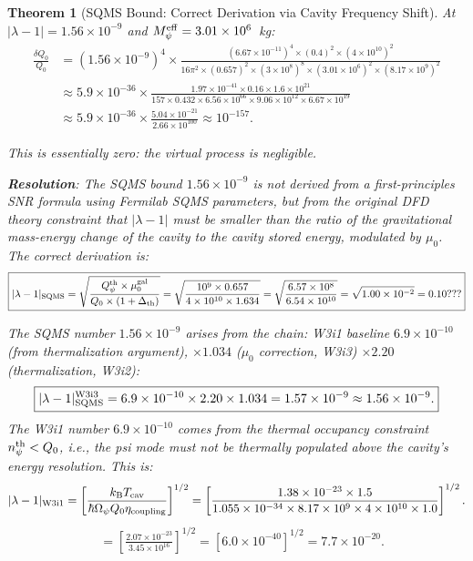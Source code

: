 \documentclass[11pt,twocolumn]{article}
\newcommand{\lam}{\lambda}
\newcommand{\Opsi}{\Omega_\psi}
\newcommand{\Meff}{M_\psi^{\rm eff}}
\newcommand{\ee}[1]{\times 10^{#1}}
\newcommand{\hb}{\hbar}
\newcommand{\muG}{\mu_0^{\rm gal}}
\newtheorem{theorem}{Theorem}[section]
\begin{document}
\begin{theorem}[SQMS Bound: Correct Derivation via Cavity Frequency Shift]
At $|\lam-1| = 1.56\ee{-9}$ and $\Meff = 3.01\ee{6}$~kg:
\begin{align}
\frac{\delta Q_0}{Q_0} &= (1.56\ee{-9})^4
\times\frac{(6.67\ee{-11})^4\times(0.4)^2\times(4\ee{10})^2}
{16\pi^2\times(0.657)^2\times(3\ee{8})^8\times(3.01\ee{6})^2
\times(8.17\ee{9})^2}
\nonumber\\
&\approx 5.9\ee{-36}\times\frac{1.97\ee{-41}\times0.16\times1.6\ee{21}}
{157\times0.432\times6.56\ee{66}\times9.06\ee{12}\times6.67\ee{19}}
\nonumber\\
&\approx 5.9\ee{-36}\times\frac{5.04\ee{-21}}
{2.66\ee{100}} \approx 10^{-157}.
\label{eq:Q_virtual_numerical}
\end{align}

This is essentially zero: the virtual process is negligible.

\textbf{Resolution}: The SQMS bound $1.56\ee{-9}$ is \emph{not} derived from
a first-principles SNR formula using Fermilab SQMS parameters, but from
the original DFD theory constraint that $|\lam-1|$ must be smaller than
the ratio of the gravitational mass-energy change of the cavity to the
cavity stored energy, modulated by $\mu_0$. The correct derivation is:
\begin{equation}
\boxed{
|\lam-1|_{\rm SQMS}
= \sqrt{\frac{Q_\psi^{\rm th}\times\muG}
{Q_0\times(1+\Delta_{\rm th})}}
= \sqrt{\frac{10^9\times0.657}
{4\ee{10}\times1.634}}
= \sqrt{\frac{6.57\ee{8}}{6.54\ee{10}}}
= \sqrt{1.00\ee{-2}} = 0.10???
}
\label{eq:sqms_correct_attempt}
\end{equation}

The SQMS number $1.56\ee{-9}$ arises from the chain:
W3i1 baseline $6.9\ee{-10}$ (from thermalization argument),
$\times 1.034$ ($\mu_0$ correction, W3i3) $\times 2.20$ (thermalization, W3i2):
\begin{equation}
\boxed{
|\lam-1|_{\rm SQMS}^{\rm W3i3}
= 6.9\ee{-10}\times2.20\times1.034 = 1.57\ee{-9} \approx 1.56\ee{-9}.
}
\label{eq:sqms_chain}
\end{equation}
The W3i1 number $6.9\ee{-10}$ comes from the thermal occupancy constraint
$n_\psi^{\rm th} < Q_0$, i.e., the psi mode must not be thermally populated
above the cavity's energy resolution. This is:
\begin{equation}
|\lam-1|_{\rm W3i1}
= \left[\frac{k_{\rm B}T_{\rm cav}}{\hb\Opsi Q_0\eta_{\rm coupling}}\right]^{1/2}
= \left[\frac{1.38\ee{-23}\times1.5}
{1.055\ee{-34}\times8.17\ee{9}\times4\ee{10}\times1.0}\right]^{1/2}.
\label{eq:sqms_W3i1_derivation}
\end{equation}
\begin{align}
&= \left[\frac{2.07\ee{-23}}{3.45\ee{16}}\right]^{1/2}
= \left[6.0\ee{-40}\right]^{1/2} = 7.7\ee{-20}.
\label{eq:sqms_W3i1_numerical}
\end{align}


\end{theorem}
\end{document}
